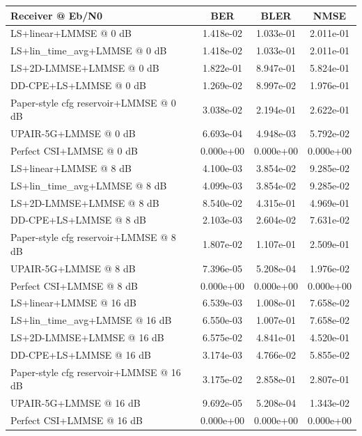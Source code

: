 \begin{tabular}{lccc}
\toprule
Receiver @ Eb/N0 & BER & BLER & NMSE \\
\midrule
LS+linear+LMMSE @ 0 dB & 1.418e-02 & 1.033e-01 & 2.011e-01 \\
LS+lin_time_avg+LMMSE @ 0 dB & 1.418e-02 & 1.033e-01 & 2.011e-01 \\
LS+2D-LMMSE+LMMSE @ 0 dB & 1.822e-01 & 8.947e-01 & 5.824e-01 \\
DD-CPE+LS+LMMSE @ 0 dB & 1.269e-02 & 8.997e-02 & 1.976e-01 \\
Paper-style cfg reservoir+LMMSE @ 0 dB & 3.038e-02 & 2.194e-01 & 2.622e-01 \\
UPAIR-5G+LMMSE @ 0 dB & 6.693e-04 & 4.948e-03 & 5.792e-02 \\
Perfect CSI+LMMSE @ 0 dB & 0.000e+00 & 0.000e+00 & 0.000e+00 \\
\midrule
LS+linear+LMMSE @ 8 dB & 4.100e-03 & 3.854e-02 & 9.285e-02 \\
LS+lin_time_avg+LMMSE @ 8 dB & 4.099e-03 & 3.854e-02 & 9.285e-02 \\
LS+2D-LMMSE+LMMSE @ 8 dB & 8.540e-02 & 4.315e-01 & 4.969e-01 \\
DD-CPE+LS+LMMSE @ 8 dB & 2.103e-03 & 2.604e-02 & 7.631e-02 \\
Paper-style cfg reservoir+LMMSE @ 8 dB & 1.807e-02 & 1.107e-01 & 2.509e-01 \\
UPAIR-5G+LMMSE @ 8 dB & 7.396e-05 & 5.208e-04 & 1.976e-02 \\
Perfect CSI+LMMSE @ 8 dB & 0.000e+00 & 0.000e+00 & 0.000e+00 \\
\midrule
LS+linear+LMMSE @ 16 dB & 6.539e-03 & 1.008e-01 & 7.658e-02 \\
LS+lin_time_avg+LMMSE @ 16 dB & 6.550e-03 & 1.007e-01 & 7.658e-02 \\
LS+2D-LMMSE+LMMSE @ 16 dB & 6.575e-02 & 4.841e-01 & 4.520e-01 \\
DD-CPE+LS+LMMSE @ 16 dB & 3.174e-03 & 4.766e-02 & 5.855e-02 \\
Paper-style cfg reservoir+LMMSE @ 16 dB & 3.175e-02 & 2.858e-01 & 2.807e-01 \\
UPAIR-5G+LMMSE @ 16 dB & 9.692e-05 & 5.208e-04 & 1.343e-02 \\
Perfect CSI+LMMSE @ 16 dB & 0.000e+00 & 0.000e+00 & 0.000e+00 \\
\bottomrule
\end{tabular}
